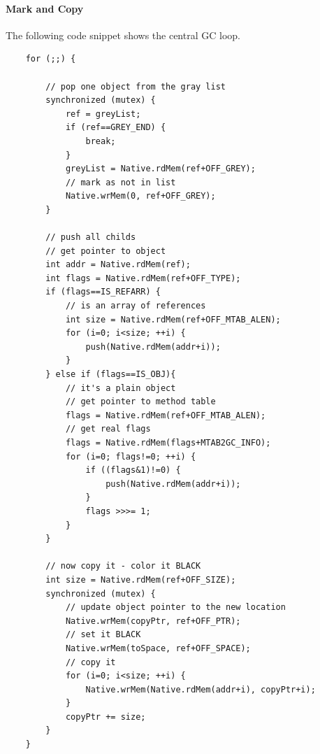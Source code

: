 \paragraph{Mark and Copy} The following code snippet shows the
central GC loop.
%
\begin{lstlisting}
    for (;;) {

        // pop one object from the gray list
        synchronized (mutex) {
            ref = greyList;
            if (ref==GREY_END) {
                break;
            }
            greyList = Native.rdMem(ref+OFF_GREY);
            // mark as not in list
            Native.wrMem(0, ref+OFF_GREY);
        }

        // push all childs
        // get pointer to object
        int addr = Native.rdMem(ref);
        int flags = Native.rdMem(ref+OFF_TYPE);
        if (flags==IS_REFARR) {
            // is an array of references
            int size = Native.rdMem(ref+OFF_MTAB_ALEN);
            for (i=0; i<size; ++i) {
                push(Native.rdMem(addr+i));
            }
        } else if (flags==IS_OBJ){
            // it's a plain object
            // get pointer to method table
            flags = Native.rdMem(ref+OFF_MTAB_ALEN);
            // get real flags
            flags = Native.rdMem(flags+MTAB2GC_INFO);
            for (i=0; flags!=0; ++i) {
                if ((flags&1)!=0) {
                    push(Native.rdMem(addr+i));
                }
                flags >>>= 1;
            }
        }

        // now copy it - color it BLACK
        int size = Native.rdMem(ref+OFF_SIZE);
        synchronized (mutex) {
            // update object pointer to the new location
            Native.wrMem(copyPtr, ref+OFF_PTR);
            // set it BLACK
            Native.wrMem(toSpace, ref+OFF_SPACE);
            // copy it
            for (i=0; i<size; ++i) {
                Native.wrMem(Native.rdMem(addr+i), copyPtr+i);
            }
            copyPtr += size;
        }
    }
\end{lstlisting}

